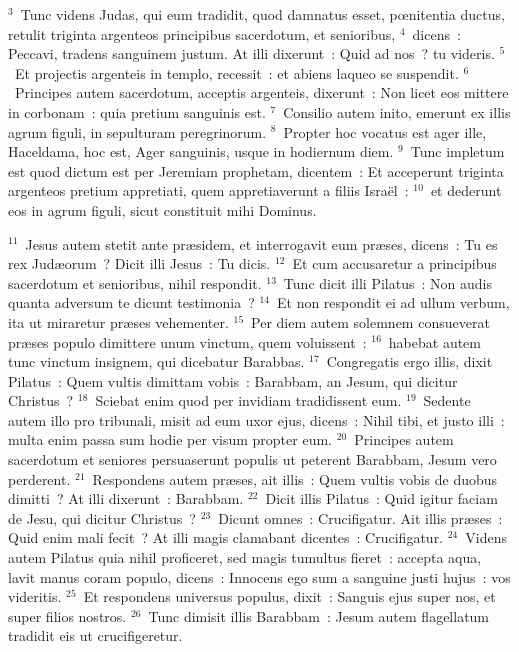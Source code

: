 ${}^{3}$~Tunc videns Judas, qui eum tradidit, quod damnatus esset, pœnitentia ductus, retulit triginta argenteos principibus sacerdotum, et senioribus,
${}^{4}$~dicens~: Peccavi, tradens sanguinem justum. At illi dixerunt~: Quid ad nos~? tu videris.
${}^{5}$~Et projectis argenteis in templo, recessit~: et abiens laqueo se suspendit.
${}^{6}$~Principes autem sacerdotum, acceptis argenteis, dixerunt~: Non licet eos mittere in corbonam~: quia pretium sanguinis est.
${}^{7}$~Consilio autem inito, emerunt ex illis agrum figuli, in sepulturam peregrinorum.
${}^{8}$~Propter hoc vocatus est ager ille, Haceldama, hoc est, Ager sanguinis, usque in hodiernum diem.
${}^{9}$~Tunc impletum est quod dictum est per Jeremiam prophetam, dicentem~: Et acceperunt triginta argenteos pretium appretiati, quem appretiaverunt a filiis Isra\"el~:
${}^{10}$~et dederunt eos in agrum figuli, sicut constituit mihi Dominus.


${}^{11}$~Jesus autem stetit ante pr\ae sidem, et interrogavit eum pr\ae ses, dicens~: Tu es rex Jud\ae orum~? Dicit illi Jesus~: Tu dicis.
${}^{12}$~Et cum accusaretur a principibus sacerdotum et senioribus, nihil respondit.
${}^{13}$~Tunc dicit illi Pilatus~: Non audis quanta adversum te dicunt testimonia~?
${}^{14}$~Et non respondit ei ad ullum verbum, ita ut miraretur pr\ae ses vehementer.
${}^{15}$~Per diem autem solemnem consueverat pr\ae ses populo dimittere unum vinctum, quem voluissent~:
${}^{16}$~habebat autem tunc vinctum insignem, qui dicebatur Barabbas.
${}^{17}$~Congregatis ergo illis, dixit Pilatus~: Quem vultis dimittam vobis~: Barabbam, an Jesum, qui dicitur Christus~?
${}^{18}$~Sciebat enim quod per invidiam tradidissent eum.
${}^{19}$~Sedente autem illo pro tribunali, misit ad eum uxor ejus, dicens~: Nihil tibi, et justo illi~: multa enim passa sum hodie per visum propter eum.
${}^{20}$~Principes autem sacerdotum et seniores persuaserunt populis ut peterent Barabbam, Jesum vero perderent.
${}^{21}$~Respondens autem pr\ae ses, ait illis~: Quem vultis vobis de duobus dimitti~? At illi dixerunt~: Barabbam.
${}^{22}$~Dicit illis Pilatus~: Quid igitur faciam de Jesu, qui dicitur Christus~?
${}^{23}$~Dicunt omnes~: Crucifigatur. Ait illis pr\ae ses~: Quid enim mali fecit~? At illi magis clamabant dicentes~: Crucifigatur.
${}^{24}$~Videns autem Pilatus quia nihil proficeret, sed magis tumultus fieret~: accepta aqua, lavit manus coram populo, dicens~: Innocens ego sum a sanguine justi hujus~: vos videritis.
${}^{25}$~Et respondens universus populus, dixit~: Sanguis ejus super nos, et super filios nostros.
${}^{26}$~Tunc dimisit illis Barabbam~: Jesum autem flagellatum tradidit eis ut crucifigeretur.



